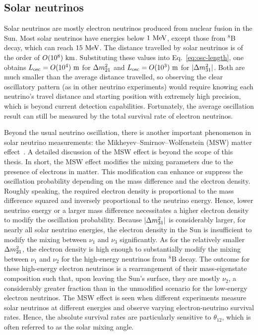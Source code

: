 \subsection{Solar neutrinos}
Solar neutrinos are mostly electron neutrinos produced from nuclear fusion in the Sun.
Most solar neutrinos have energies below $1~\textrm{MeV}$, except those from $^8$B decay, which can reach $15~\textrm{MeV}$.
The distance travelled by solar neutrinos is of the order of $O(10^8)~\textrm{km}$.
Substituting these values into Eq.~\ref{eq:osc-length}, one obtains $L_{\text{osc}} = O(10^4)~\textrm{m}$ for $\Delta m^2_{21}$ and $L_{\text{osc}} = O(10^3)~\textrm{m}$ for $|\Delta m^2_{31}|$.
Both are much smaller than the average distance travelled, so observing the clear oscillatory pattern (as in other neutrino experiments) would require knowing each neutrino’s travel distance and starting position with extremely high precision, which is beyond current detection capabilities.
Fortunately, the average oscillation result can still be measured by the total survival rate of electron neutrinos.

Beyond the usual neutrino oscillation, there is another important phenomenon in solar neutrino measurements: the Mikheyev–Smirnov–Wolfenstein (MSW) matter effect~\cite{Wolfenstein:1977ue,Mikheyev:1985zog}.
A detailed discussion of the MSW effect is beyond the scope of this thesis.
In short, the MSW effect modifies the mixing parameters due to the presence of electrons in matter.
This modification can enhance or suppress the oscillation probability depending on the mass difference and the electron density.
Roughly speaking, the required electron density is proportional to the mass difference squared and inversely proportional to the neutrino energy.
Hence, lower neutrino energy or a larger mass difference necessitates a higher electron density to modify the oscillation probability.
Because $|\Delta m^2_{31}|$ is considerably larger, for nearly all solar neutrino energies, the electron density in the Sun is insufficient to modify the mixing between $\nu_1$ and $\nu_3$ significantly.
As for the relatively smaller $\Delta m^2_{21}$, the electron density is high enough to substantially modify the mixing between $\nu_1$ and $\nu_2$ for the high-energy neutrinos from $^8$B decay.
The outcome for these high-energy electron neutrinos is a rearrangement of their mass-eigenstate composition such that, upon leaving the Sun’s surface, they are mostly $\nu_2$, a considerably greater fraction than in the unmodified scenario for the low-energy electron neutrinos.
The MSW effect is seen when different experiments measure solar neutrinos at different energies and observe varying electron-neutrino survival rates.
Hence, the absolute survival rates are particularly sensitive to $\theta_{12}$, which is often referred to as the solar mixing angle. 

